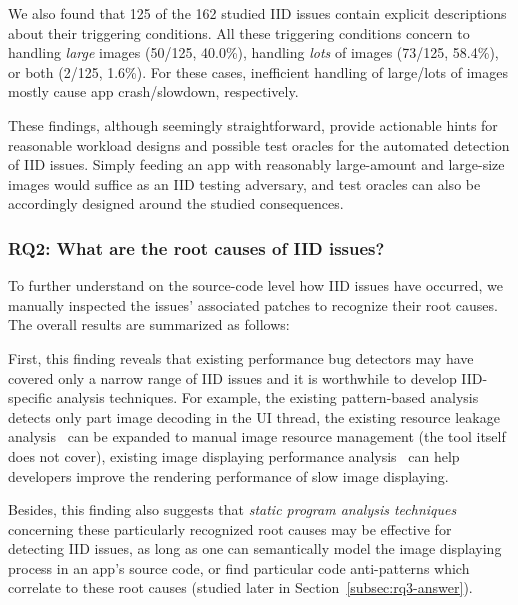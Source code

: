 We also found that 125 of the 162 studied IID issues contain explicit descriptions about their triggering conditions.
All these triggering conditions concern to handling \emph{large} images (50/125, 40.0\%), handling \emph{lots} of images (73/125, 58.4\%), or both (2/125, 1.6\%).
For these cases, inefficient handling of large/lots of images mostly cause app crash/slowdown, respectively.

These findings, although seemingly straightforward, provide actionable hints for reasonable workload designs and possible test oracles for the automated detection of IID issues.
Simply feeding an app with reasonably large-amount and large-size images would suffice as an IID testing adversary,
and test oracles can also be accordingly designed around the studied consequences.

\medskip

\subsubsection{RQ2: What are the root causes of IID issues?} \label{subsec:rq2-answer}

To further understand on the source-code level how IID issues have occurred,
we manually inspected the issues' associated patches to recognize their root causes.
The overall results are summarized as follows:


First, this finding reveals that existing performance bug detectors may have covered only a narrow range of IID issues and it is worthwhile to develop IID-specific analysis techniques.
For example, the existing pattern-based analysis~\cite{liu2014characterizing} detects only part image decoding in the UI thread, the existing resource leakage analysis~\cite{wu2016light} can be expanded to manual image resource management (the tool itself does not cover), existing image displaying performance analysis~\cite{gao2017every} can help developers improve the rendering performance of slow image displaying.

Besides, this finding also suggests that \emph{static program analysis techniques} concerning these particularly recognized root causes may be effective for detecting IID issues,
as long as one can semantically model the image displaying process in an app's source code,
or find particular code anti-patterns which correlate to these root causes (studied later in Section~\ref{subsec:rq3-answer}).

